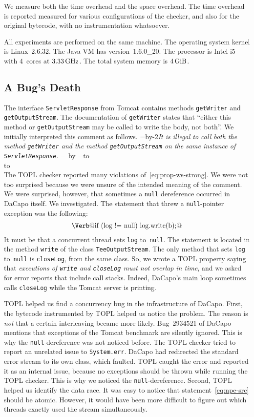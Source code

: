 \documentclass[9pt, preprint]{sigplanconf} %
\newcommand{\noterg}[2]{\textcolor{gray}{[\textcolor{red}{#1}: #2]}}
\newcommand{\rg}[1]{\noterg{rg}{#1}}
\newcommand{\quoteindent}{1.5\parindent} %
\newcommand{\eqquote}[2]{{%
  \refstepcounter{equation}\label{#2}%
  \newdimen\qi\qi=\quoteindent
  \setbox0=\vbox{\advance\hsize by-2\qi\noindent\em#1}%
  \newdimen\x\x=\ht0 \advance\x by\dp0%
  \setbox1=\vbox to\x{\vss\hbox{(\arabic{equation})}\vss}%
  \leavevmode\\[1ex]%
  \hbox to\hsize{\hskip\qi\box0\hfil\box1}%
  \\[1ex]}}
\theoremstyle{definition}
\theoremstyle{remark}
\begin{document}
We measure both the time overhead and the space overhead.
The time overhead is reported measured for various configurations of the checker, and also for the original bytecode, with no instrumentation whatsoever.

All experiments are performed on the same machine.
The operating system kernel is Linux~2.6.32.
The Java VM has version~1.6.0\_20.
The processor is Intel i5 with $4$~cores at $3.33\rm\,GHz$.
The total system memory is $4\rm\,GiB$.

\subsection{A Bug's Death} %

The interface \texttt{ServletResponse} from Tomcat contains methods \texttt{getWriter} and \texttt{getOutputStream}.
The documentation of \texttt{getWriter} states that ``either this method or \texttt{getOutputStream} may be called to write the body, not both''.
We initially interpreted this comment as follows.
\eqquote{It is illegal to call both the method {\tt getWriter} and the method {\tt getOutputStream} on the same instance of {\tt ServletResponse}.}{eq:prop-ws-strong}
The TOPL checker reported many violations of~\eqref{eq:prop-ws-strong}.
We were not too surprised because we were unsure of the intended meaning of the comment.
We were surprised, however, that sometimes a {\tt null} dereference occurred in DaCapo itself.
We investigated.
The statement that threw a {\tt null}-pointer exception was the following:
\begin{align}\label{eq:npe-src}
\text{\Verb@if (log != null) log.write(b);@}
\end{align}
It must be that a concurrent thread sets {\tt log} to~{\tt null}.
The statement is located in the method {\tt write} of the class {\tt TeeOutputStream}.
The only method that sets {\tt log} to~{\tt null} is {\tt closeLog}, from the same class.
So, we wrote a TOPL property saying that \textit{executions of {\tt write} and {\tt closeLog} must not overlap in time}, and we asked for error reports that include call stacks.
Indeed, DaCapo's main loop sometimes calls {\tt closeLog} while the Tomcat server is printing.

TOPL helped us find a concurrency bug in the infrastructure of DaCapo.
First, the bytecode instrumented by TOPL helped us notice the problem.
The reason is \emph{not} that a certain interleaving became more likely.
Bug~2934521 of DaCapo mentions that exceptions of the Tomcat benchmark are silently ignored.
This is why the {\tt null}-dereference was not noticed before.
The TOPL checker tried to report an unrelated issue to {\tt System.err}.
DaCapo had redirected the standard error stream to its own class, which faulted.
TOPL caught the error and reported it as an internal issue, because no exceptions should be thrown while running the TOPL checker.
This is why we noticed the {\tt null}-dereference.
Second, TOPL helped us identify the data race.
It was easy to notice that statement~\eqref{eq:npe-src} should be atomic.
However, it would have been more difficult to figure out which threads exactly used the stream simultaneously.
\end{document}
